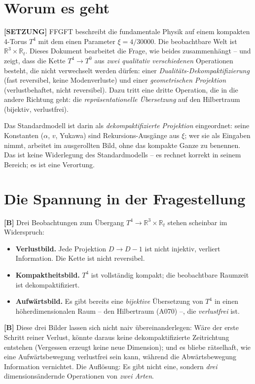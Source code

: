 \section{Worum es geht}

\textbf{[SETZUNG]} FFGFT beschreibt die fundamentale Physik auf einem kompakten
4-Torus $T^4$ mit dem einen Parameter $\xi=4/30000$. Die beobachtbare Welt ist
$\mathbb{R}^3\times\mathbb{R}_t$. Dieses Dokument bearbeitet die Frage, wie beides
zusammenhängt -- und zeigt, dass die Kette $T^4\to T^0$ aus \emph{zwei qualitativ
verschiedenen} Operationen besteht, die nicht verwechselt werden dürfen: einer
\emph{Dualitäts-Dekompaktifizierung} (fast reversibel, keine Modenverluste) und
einer \emph{geometrischen Projektion} (verlustbehaftet, nicht reversibel). Dazu
tritt eine dritte Operation, die in die andere Richtung geht: die
\emph{repräsentationelle Übersetzung} auf den Hilbertraum (bijektiv, verlustfrei).

Das Standardmodell ist darin als \emph{dekompaktifizierte Projektion} eingeordnet:
seine Konstanten ($\alpha$, $v$, Yukawa) sind Rekursions-Ausgänge aus $\xi$; wer
sie als Eingaben nimmt, arbeitet im ausgerollten Bild, ohne das kompakte Ganze zu
benennen. Das ist keine Widerlegung des Standardmodells -- es rechnet korrekt in
seinem Bereich; es ist eine Verortung.

\section{Die Spannung in der Fragestellung}

\textbf{[B]} Drei Beobachtungen zum Übergang $T^4\to\mathbb{R}^3\times\mathbb{R}_t$
stehen scheinbar im Widerspruch:

\begin{itemize}[leftmargin=2em,itemsep=3pt,topsep=3pt]
  \item \textbf{Verlustbild.} Jede Projektion $D\to D-1$ ist nicht injektiv,
    verliert Information. Die Kette ist nicht reversibel.
  \item \textbf{Kompaktheitsbild.} $T^4$ ist vollständig kompakt; die
    beobachtbare Raumzeit ist dekompaktifiziert.
  \item \textbf{Aufwärtsbild.} Es gibt bereits eine \emph{bijektive} Übersetzung
    von $T^4$ in einen höherdimensionalen Raum -- den Hilbertraum (A070) --, die
    \emph{verlustfrei} ist.
\end{itemize}

\textbf{[B]} Diese drei Bilder lassen sich nicht naiv übereinanderlegen: Wäre der
erste Schritt reiner Verlust, könnte daraus keine dekompaktifizierte Zeitrichtung
entstehen (Vergessen erzeugt keine neue Dimension); und es bliebe rätselhaft, wie
eine Aufwärtsbewegung verlustfrei sein kann, während die Abwärtsbewegung
Information vernichtet. Die Auflösung: Es gibt nicht eine, sondern
\emph{drei} dimensionsändernde Operationen von \emph{zwei Arten}.

